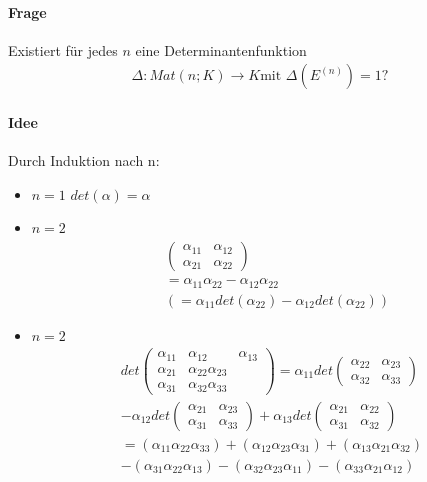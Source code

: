 \documentclass[11pt]{report}
\begin{document}
\paragraph{Frage}
Existiert für jedes $n$ eine Determinantenfunktion
\begin{align}
\Delta : Mat(n;K) \rightarrow K
\text{mit } \Delta(E^{(n)}) = 1?
\end{align}

\paragraph{Idee}
Durch Induktion nach n:
\begin{itemize}
 \item $n=1$ $det(\alpha) = \alpha$
 \item $n=2$
\begin{align}
&\begin{pmatrix} \alpha_{11} & \alpha_{12} \\ \alpha_{21} & \alpha_{22}\end{pmatrix} \\
&= \alpha_{11}\alpha_{22} - \alpha_{12} \alpha_{22} \\
&(= \alpha_{11} det(\alpha_{22}) - \alpha_{12} det(\alpha_{22}))
\end{align}
 \item $n=2$
\begin{align}
det \begin{pmatrix} \alpha_{11} & \alpha_{12} & \alpha_{13} \\ \alpha_{21} & \alpha_{22} \alpha_{23} \\ \alpha_{31} & \alpha_{32} \alpha_{33} \end{pmatrix} = \alpha_{11} det \begin{pmatrix} \alpha_{22} & \alpha_{23} \\ \alpha_{32} & \alpha_{33}\end{pmatrix} \\
- \alpha_{12} det \begin{pmatrix} \alpha_{21} & \alpha_{23} \\ \alpha_{31} & \alpha_{33}\end{pmatrix} + \alpha_{13} det \begin{pmatrix} \alpha_{21} & \alpha_{22} \\ \alpha_{31} & \alpha_{32}\end{pmatrix} \\
= (\alpha_{11}\alpha_{22}\alpha_{33}) + (\alpha_{12} \alpha_{23} \alpha_{31}) + (\alpha_{13} \alpha_{21} \alpha_{32})\\ 
- (\alpha_{31} \alpha_{22} \alpha_{13}) - (\alpha_{32}\alpha_{23}\alpha_{11}) - (\alpha_{33}\alpha_{21}\alpha_{12})
\end{align}


\end{itemize}
\end{document}
